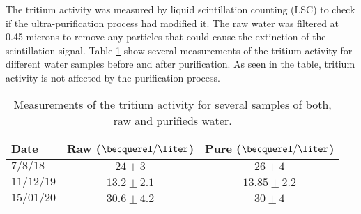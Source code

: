 
The tritium activity was measured by liquid scintillation counting (LSC) to check if the ultra-purification process had modified it. The raw water was filtered at 0.45 microns to remove any particles that could cause the extinction of the scintillation signal. Table \ref{tab:ActivityTritiumValues} show several measurements of the tritium activity for different water samples before and after purification. As seen in the table, tritium activity is not affected by the purification process.

\begin{table}[htbp]
\centering{}%
\begin{tabular}{lcc}
\toprule 
Date & Raw ($\becquerel/\liter$) & Pure ($\becquerel/\liter$) \tabularnewline
\midrule
\midrule 
$7/8/18$ & $24 \pm 3$ & $26 \pm 4$ \tabularnewline
$11/12/19$ & $13.2 \pm 2.1$ & $13.85 \pm 2.2$ \tabularnewline
$15/01/20$ & $30.6 \pm 4.2$ & $30 \pm 4$ \tabularnewline
\bottomrule
\end{tabular}
\caption{Measurements of the tritium activity for several samples of both, raw and purifieds water.}
\label{tab:ActivityTritiumValues}
\end{table}